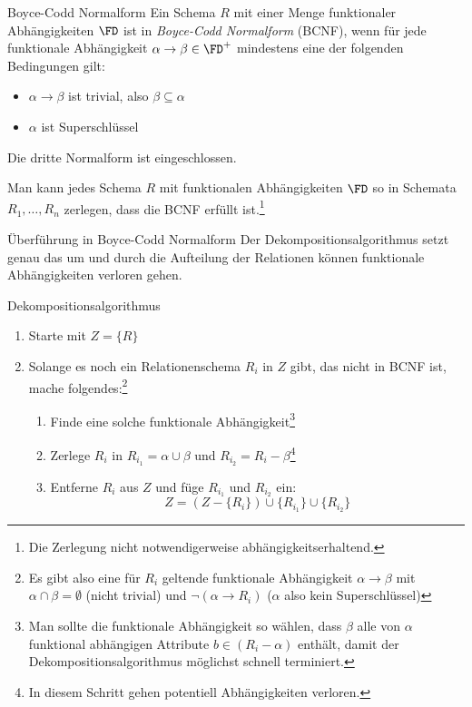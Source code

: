\begin{defi}{Boyce-Codd Normalform}
    Ein Schema $R$ mit einer Menge funktionaler Abhängigkeiten $\FD$ ist in \emph{Boyce-Codd Normalform} (BCNF), wenn für jede funktionale Abhängigkeit $\alpha \to \beta \in \FD^+$ mindestens eine der folgenden Bedingungen gilt:
    \begin{itemize}
        \item $\alpha \to \beta$ ist trivial, also $\beta \subseteq \alpha$
        \item $\alpha$ ist Superschlüssel
    \end{itemize}

    Die dritte Normalform ist eingeschlossen.

    Man kann jedes Schema $R$ mit funktionalen Abhängigkeiten $\FD$ so in Schemata $R_1,\ldots , R_n$ zerlegen, dass die BCNF erfüllt ist.\footnote{Die Zerlegung nicht notwendigerweise abhängigkeitserhaltend.}
\end{defi}

\begin{algo}{Überführung in Boyce-Codd Normalform}
    Der Dekompositionsalgorithmus setzt genau das um und durch die Aufteilung der Relationen können funktionale Abhängigkeiten verloren gehen.
\end{algo}

\begin{algo}{Dekompositionsalgorithmus}
    \begin{enumerate}
        \item Starte mit $Z = \{R\}$
        \item Solange es noch ein Relationenschema $R_i$ in $Z$ gibt, das nicht in BCNF ist, mache folgendes:\footnote{Es gibt also eine für $R_i$ geltende funktionale Abhängigkeit $\alpha \to \beta$ mit $\alpha \cap \beta = \emptyset$ (nicht trivial) und $\lnot (\alpha \to R_i)$ ($\alpha$ also kein Superschlüssel)}
              \begin{enumerate}
                  \item Finde eine solche funktionale Abhängigkeit\footnote{Man sollte die funktionale Abhängigkeit so wählen, dass $\beta$ alle von $\alpha$ funktional abhängigen Attribute $b \in (R_i - \alpha)$ enthält, damit der Dekompositionsalgorithmus möglichst schnell terminiert.}
                  \item Zerlege $R_i$ in $R_{i_1} = \alpha \cup \beta$ und $R_{i_2} = R_i - \beta$\footnote{In diesem Schritt gehen potentiell Abhängigkeiten verloren.}
                  \item Entferne $R_i$ aus $Z$ und füge $R_{i_1}$ und $R_{i_2}$ ein:
                        \[
                            Z = (Z - \{R_i\}) \cup \{R_{i_1}\} \cup \{R_{i_2}\}
                        \]
              \end{enumerate}
    \end{enumerate}
\end{algo}

